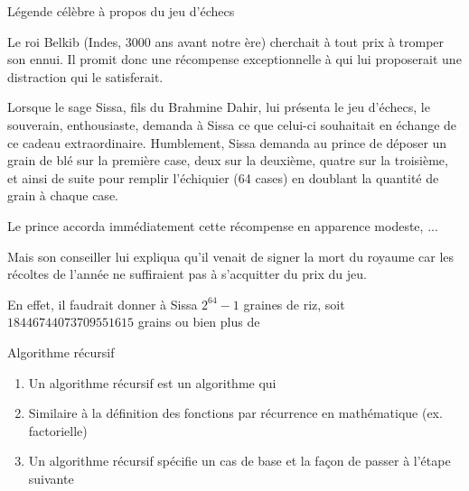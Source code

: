 \begin{frame}{Légende célèbre à propos du jeu d'échecs}

 Le roi Belkib (Indes, 3000 ans avant notre ère) cherchait à
 tout prix à tromper son ennui. Il promit donc une récompense exceptionnelle à qui lui proposerait une distraction qui le
    satisferait.

 Lorsque le sage Sissa, fils du Brahmine Dahir, lui présenta le
    jeu d'échecs, le souverain, enthousiaste, demanda à Sissa ce que
    celui-ci souhaitait en échange de ce cadeau extraordinaire.
 Humblement, Sissa demanda au prince de déposer un grain de blé
    sur la première case, deux sur la deuxième, quatre sur la
    troisième, et ainsi de suite pour remplir l'échiquier (64 cases)
    en doublant la quantité de grain à chaque case.  


 Le prince accorda immédiatement cette récompense en apparence
 modeste, ...
\end{frame}
\begin{frame}
  Mais son conseiller lui expliqua qu'il venait de signer la mort du
  royaume car les récoltes de l'année ne suffiraient pas à s'acquitter du
  prix du jeu. 


  En effet, il faudrait donner à Sissa $2^{64} -1$ graines de riz, soit
  $18 446 744 073 709 551 615$ grains ou bien plus de  
\end{frame}


\begin{frame}{Algorithme récursif}
  \begin{enumerate}
  \item Un algorithme récursif est un algorithme qui {} 
  \item Similaire à la définition des fonctions par récurrence en mathématique (ex. factorielle)
\item Un algorithme récursif spécifie un cas de base et la façon de passer à l’étape suivante
  \end{enumerate}
\end{frame}

